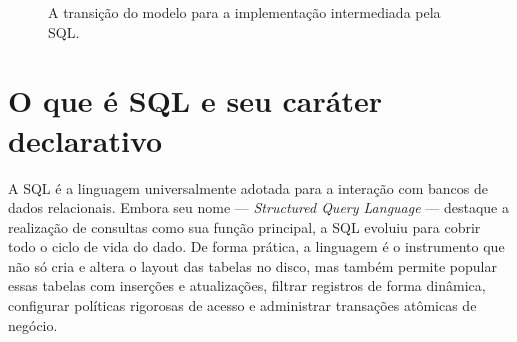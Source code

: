 \begin{figure}[htpb]
    \centering
    \caption{A transição do modelo para a implementação intermediada pela SQL.}
    \label{fig:transicao_sql}
\end{figure}

\section{O que é SQL e seu caráter declarativo}

A SQL é a linguagem universalmente adotada para a interação com bancos de dados relacionais. Embora seu nome — \textit{Structured Query Language} — destaque a realização de consultas como sua função principal, a SQL evoluiu para cobrir todo o ciclo de vida do dado. De forma prática, a linguagem é o instrumento que não só cria e altera o layout das tabelas no disco, mas também permite popular essas tabelas com inserções e atualizações, filtrar registros de forma dinâmica, configurar políticas rigorosas de acesso e administrar transações atômicas de negócio.

